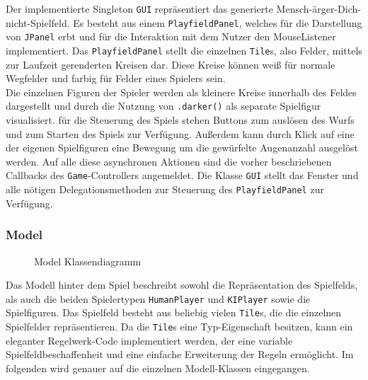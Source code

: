 \documentclass[conference]{IEEEtran}
\begin{document}
Der implementierte Singleton \texttt{GUI} repr\"asentiert das generierte Mensch-\"arger-Dich-nicht-Spielfeld. Es besteht aus einem \texttt{PlayfieldPanel}, welches f\"ur die Darstellung von \texttt{JPanel} erbt und f\"ur die Interaktion mit dem Nutzer den MouseListener implementiert. Das \texttt{PlayfieldPanel} stellt die einzelnen \texttt{Tile}s, also Felder, mittels zur Laufzeit gerenderten Kreisen dar. Diese Kreise k\"onnen wei{\ss} f\"ur normale Wegfelder und farbig f\"ur Felder eines Spielers sein. \\
  Die einzelnen Figuren der Spieler werden als kleinere Kreise innerhalb des Feldes dargestellt und durch die Nutzung von \texttt{.darker()} als separate Spielfigur visualisiert. f\"ur die Steuerung des Spiels stehen Buttons zum ausl\"osen des Wurfs und zum Starten des Spiels zur Verf\"ugung. Au{\ss}erdem kann durch Klick auf eine der eigenen Spielfiguren eine Bewegung um die gew\"urfelte Augenanzahl ausgel\"ost werden. Auf alle diese asynchronen Aktionen sind die vorher beschriebenen Callbacks des \texttt{Game}-Controllers angemeldet. Die Klasse \texttt{GUI} stellt das Fenster und alle n\"otigen Delegationsmethoden zur Steuerung des \texttt{PlayfieldPanel} zur Verf\"ugung. \\

\subsubsection{Model}
\begin{figure}[]
    \centering
    \caption{Model Klassendiagramm}
\end{figure}

Das Modell hinter dem Spiel beschreibt sowohl die Repr\"asentation des Spielfelds, als auch die beiden Spielertypen \texttt{HumanPlayer} und \texttt{KIPlayer} sowie die Spielfiguren. Das Spielfeld besteht aus beliebig vielen \texttt{Tile}s, die die einzelnen Spielfelder repr\"asentieren. Da die \texttt{Tile}s eine Typ-Eigenschaft besitzen, kann ein eleganter Regelwerk-Code implementiert werden, der eine variable Spielfeldbeschaffenheit und eine einfache Erweiterung der Regeln erm\"oglicht.
Im folgenden wird genauer auf die einzelnen Modell-Klassen eingegangen.\\
\end{document}
